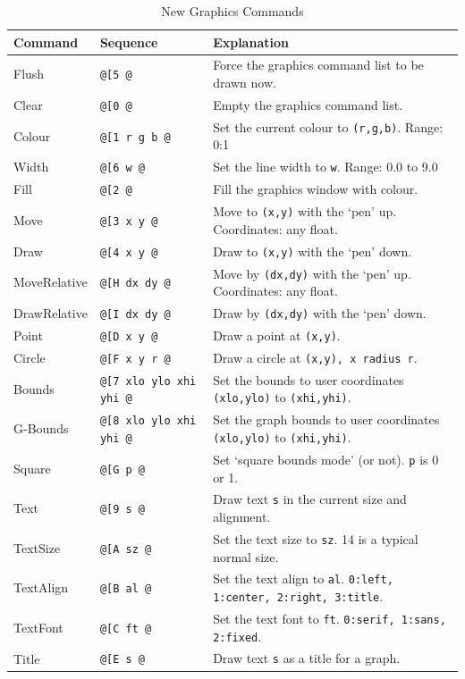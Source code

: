 \documentclass[a4paper,twoside,11pt]{article}
\begin{document}
\begin{table}
\centering
\begin{tabular}{|| l | l | l ||}
\hline
Command & Sequence & Explanation\\
\hline
Flush  & \texttt{@[5 @}             & \footnotesize{Force the graphics command list to be drawn now.}\\
Clear  & \texttt{@[0 @}             & \footnotesize{Empty the graphics command list.}\\
Colour & \texttt{@[1 r g b @} & \footnotesize{Set the current colour to \texttt{(r,g,b)}. Range: 0:1}\\
Width  & \texttt{@[6 w @}         & \footnotesize{Set the line width to \texttt{w}. Range: 0.0 to 9.0}\\
 \hline
Fill   & \texttt{@[2 @}             & \footnotesize{Fill the graphics window with colour.}\\
Move   & \texttt{@[3 x y @}   & \footnotesize{Move to \texttt{(x,y)} with the `pen' up. Coordinates: any float.}\\
Draw   & \texttt{@[4 x y @}   & \footnotesize{Draw to \texttt{(x,y)} with the `pen' down.}\\
MoveRelative   & \texttt{@[H dx dy @}   & \footnotesize{Move by \texttt{(dx,dy)} with the `pen' up. Coordinates: any float.}\\
DrawRelative   & \texttt{@[I dx dy @}   & \footnotesize{Draw by \texttt{(dx,dy)} with the `pen' down.}\\
Point & \texttt{@[D x y @}         & \footnotesize{Draw a point at \texttt{(x,y)}.}\\
Circle & \texttt{@[F x y r @}         & \footnotesize{Draw a circle at \texttt{(x,y), x radius \texttt{r}}.}\\
\hline
Bounds   & \texttt{@[7 xlo ylo xhi yhi @}   & \footnotesize{Set the bounds to user coordinates \texttt{(xlo,ylo)} to \texttt{(xhi,yhi)}.}\\
G-Bounds   & \texttt{@[8 xlo ylo xhi yhi @}   & \footnotesize{Set the graph bounds to user coordinates \texttt{(xlo,ylo)} to \texttt{(xhi,yhi)}.}\\
Square & \texttt{@[G p @}         & \footnotesize{Set `square bounds mode' (or not). \texttt{p} is 0 or 1.}\\
Text & \texttt{@[9 s @}         & \footnotesize{Draw text \texttt{s} in the current size and alignment.}\\
TextSize & \texttt{@[A sz @}         & \footnotesize{Set the text size to \texttt{sz}. 14 is a typical normal size.}\\
TextAlign & \texttt{@[B al @}         & \footnotesize{Set the text align to \texttt{al}. \texttt{0:left, 1:center, 2:right, 3:title}.}\\
TextFont & \texttt{@[C ft @}         & \footnotesize{Set the text font to \texttt{ft}. \texttt{0:serif, 1:sans, 2:fixed}.}\\
Title & \texttt{@[E s @}         & \footnotesize{Draw text \texttt{s} as a title for a graph.}\\
\hline
\end{tabular}
\caption{New Graphics Commands}
\label{tab:graphicscmds2}
\end{table}
\end{document}
